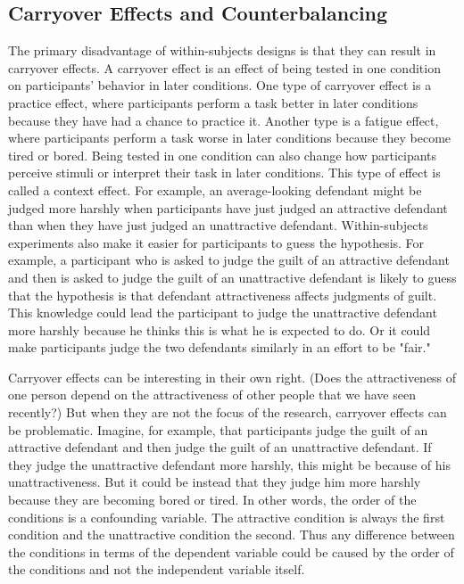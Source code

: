 \subsection{Carryover Effects and Counterbalancing}

The primary disadvantage of within-subjects designs is that they can result in carryover effects. A carryover effect is an effect of being tested in one condition on participants' behavior in later conditions. One type of carryover effect is a practice effect, where participants perform a task better in later conditions because they have had a chance to practice it. Another type is a fatigue effect, where participants perform a task worse in later conditions because they become tired or bored. Being tested in one condition can also change how participants perceive stimuli or interpret their task in later conditions. This type of effect is called a context effect. For example, an average-looking defendant might be judged more harshly when participants have just judged an attractive defendant than when they have just judged an unattractive defendant. Within-subjects experiments also make it easier for participants to guess the hypothesis. For example, a participant who is asked to judge the guilt of an attractive defendant and then is asked to judge the guilt of an unattractive defendant is likely to guess that the hypothesis is that defendant attractiveness affects judgments of guilt. This knowledge could lead the participant to judge the unattractive defendant more harshly because he thinks this is what he is expected to do. Or it could make participants judge the two defendants similarly in an effort to be "fair."

Carryover effects can be interesting in their own right. (Does the attractiveness of one person depend on the attractiveness of other people that we have seen recently?) But when they are not the focus of the research, carryover effects can be problematic. Imagine, for example, that participants judge the guilt of an attractive defendant and then judge the guilt of an unattractive defendant. If they judge the unattractive defendant more harshly, this might be because of his unattractiveness. But it could be instead that they judge him more harshly because they are becoming bored or tired. In other words, the order of the conditions is a confounding variable. The attractive condition is always the first condition and the unattractive condition the second. Thus any difference between the conditions in terms of the dependent variable could be caused by the order of the conditions and not the independent variable itself.

